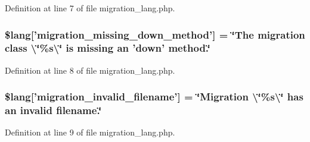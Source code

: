 Definition at line 7 of file migration\-\_\-lang.\-php.

\subsubsection[{\$lang}]{\setlength{\rightskip}{0pt plus 5cm}\$lang['migration\-\_\-missing\-\_\-down\-\_\-method'] = \char`\"{}The migration class \textbackslash{}\char`\"{}\%s\textbackslash{}\char`\"{} is missing an 'down' method.\char`\"{}}\label{migration__lang_8php_a6e835ce0b327b8ea1df42bfc7a59f1cd}


Definition at line 8 of file migration\-\_\-lang.\-php.

\subsubsection[{\$lang}]{\setlength{\rightskip}{0pt plus 5cm}\$lang['migration\-\_\-invalid\-\_\-filename'] = \char`\"{}Migration \textbackslash{}\char`\"{}\%s\textbackslash{}\char`\"{} has an invalid filename.\char`\"{}}\label{migration__lang_8php_a75ef7572f25674e4dd1e36a0d61080fa}


Definition at line 9 of file migration\-\_\-lang.\-php.

